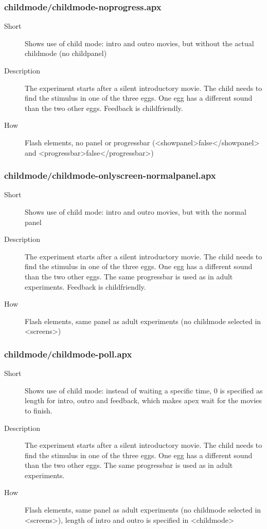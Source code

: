 \subsubsection{childmode/childmode-noprogress.apx}
\begin{description}
\item[Short] 
 Shows use of child mode: intro and outro movies, but without the actual childmode (no childpanel)
\item[Description] 
 The experiment starts after a silent introductory movie. The child needs to find the stimulus in one of the three eggs. One egg has a different sound than the two other eggs. Feedback is childfriendly.
\item[How] 
 Flash elements, no panel or progressbar (\textless{}showpanel\textgreater{}false\textless{}/showpanel\textgreater{} and \textless{}progressbar\textgreater{}false\textless{}/progressbar\textgreater{})
\end{description}

\subsubsection{childmode/childmode-onlyscreen-normalpanel.apx}
\begin{description}
\item[Short] 
 Shows use of child mode: intro and outro movies, but with the normal panel
\item[Description] 
 The experiment starts after a silent introductory movie. The child needs to find the stimulus in one of the three eggs. One egg has a different sound than the two other eggs. The same progressbar is used as in adult experiments. Feedback is childfriendly.
\item[How] 
 Flash elements, same panel as adult experiments (no childmode selected in \textless{}screens\textgreater{})
\end{description}

\subsubsection{childmode/childmode-poll.apx}
\begin{description}
\item[Short] 
  Shows use of child mode: instead of waiting a specific time, 0 is specified as length for intro, outro and feedback, which makes apex wait for the movies to finish.
\item[Description] 
 The experiment starts after a silent introductory movie. The child needs to find the stimulus in one of the three eggs. One egg has a different sound than the two other eggs. The same progressbar is used as in adult experiments.
\item[How] 
 Flash elements, same panel as adult experiments (no childmode selected in \textless{}screens\textgreater{}), length of intro and outro is specified in \textless{}childmode\textgreater{}
\end{description}

